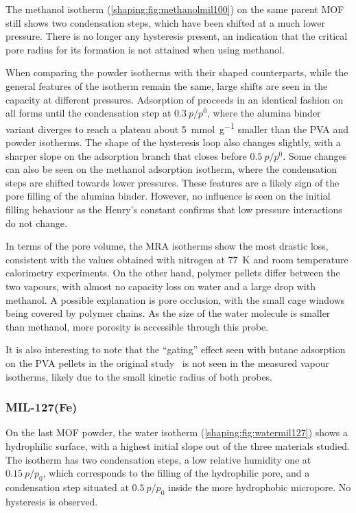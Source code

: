 The methanol isotherm (\autoref{shaping:fig:methanolmil100}) on 
the same parent \gls{MOF} still shows 
two condensation steps, which have been shifted at a much
lower pressure. There is no longer any hysteresis present,
an indication that the critical pore radius for its formation
is not attained when using methanol.

When comparing the powder isotherms with their shaped counterparts,
while the general features of the isotherm remain the same, 
large shifts are seen in the capacity at different pressures.
Adsorption of  proceeds in an identical fashion
on all forms until the condensation step at \(0.3~p/p^0\), where
the alumina binder variant diverges to reach a plateau about
\SI{5}{\milli\mol\per\gram} smaller than the \gls{PVA} and powder
isotherms. The shape of the hysteresis loop also changes slightly,
with a sharper slope on the adsorption branch that closes 
before \(0.5~p/p^0\). Some changes can also be seen on the methanol
adsorption isotherm, where the condensation steps are shifted 
towards lower pressures. These features are a likely sign of 
the pore filling of the alumina binder.
However, no influence is seen on the initial filling behaviour
as the Henry's constant confirms that low pressure 
interactions do not change. 

In terms of the pore volume, the \gls{MRA} isotherms 
show the most drastic loss, consistent with the values 
obtained with nitrogen at \SI{77}{\kelvin} and room temperature
calorimetry experiments. On the other hand, polymer pellets differ 
between the two vapours, with almost no capacity loss on water 
and a large drop with methanol. A possible explanation is 
pore occlusion, with the small cage windows being covered by 
polymer chains. As the size of the water molecule is smaller 
than methanol, more porosity is accessible through this probe.

It is also interesting to note that the
``gating'' effect seen with butane adsorption on the \gls{PVA} pellets
in the original study~\cite{chanutObservingEffectsShaping2016}
is not seen in the measured vapour isotherms, likely due to the 
small kinetic radius of both probes.

\subsubsection{MIL-127(Fe)}

On the last \gls{MOF} powder, the water isotherm 
(\autoref{shaping:fig:watermil127}) shows a hydrophilic
surface, with a highest initial slope out of the three 
materials studied. The isotherm has two condensation steps,
a low relative humidity one at \(0.15~p/p_0\), which corresponds
to the filling of the hydrophilic pore, and a condensation 
step situated at \(0.5~p/p_0\) inside the more hydrophobic micropore.
No hysteresis is observed.


